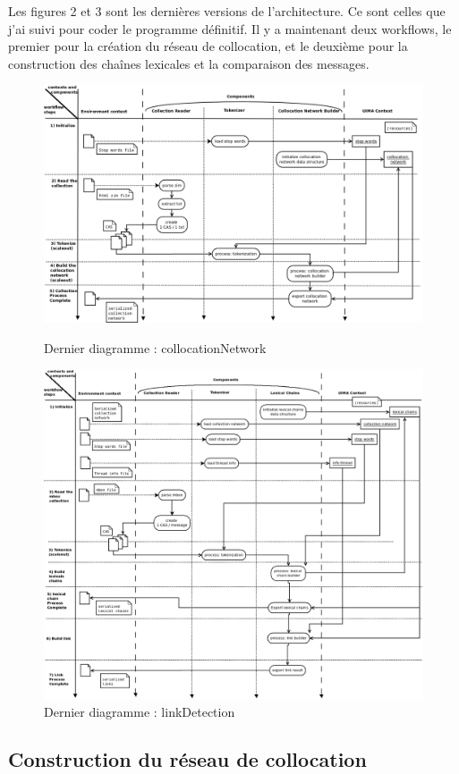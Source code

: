 \documentclass[a4paper]{article}
\begin{document}
Les figures 2 et 3 sont les dernières versions de l'architecture. Ce sont celles que j'ai suivi pour coder le programme définitif. Il y a maintenant deux workflows, le premier pour la création du réseau de collocation, et le deuxième pour la construction des chaînes lexicales et la comparaison des messages.
	
	\begin{figure}[!]
  	\centering
  	\includegraphics[width=1\textwidth]{Figures/cn.png}
  	\caption{Dernier diagramme : collocationNetwork}
  	\includegraphics[width=1\textwidth]{Figures/mondiagramme.png}
  	\caption{Dernier diagramme : linkDetection}
	\end{figure}
	
	
	\subsection{Construction du réseau de collocation}
	
\end{document}
